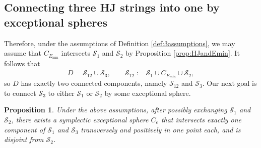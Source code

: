 \documentclass[11pt]{article}
\newtheorem{proposition}[theorem]{Proposition}
\theoremstyle{definition}
\theoremstyle{remark}
\newcommand{\st}{\mathcal{S}}
\begin{document}
\subsection{Connecting three HJ strings into one by exceptional spheres}\label{section:connecting}
Therefore, under the assumptions of Definition \ref{def:3assumptions}, we may assume that $C_{E_{\text{min}}}$ intersects $\st_1$ and $\st_2$ by Proposition \ref{prop:HJandEmin}. It follows that
\[
  \overline{D} = \st_{12} \cup \st_3,
  \qquad
  \st_{12} := \st_1  \cup C_{E_{\text{min}}}\cup \st_2,
\]
so $\overline{D}$ has exactly two connected components, namely $\st_{12}$ and $\st_3$. 
Our next goal is to connect $\st_3$ to either $\st_1$ or $\st_2$ by some exceptional sphere.

\begin{proposition}\label{prop:secondexceptional}
 Under the above assumptions, after possibly exchanging $\st_1$ and $\st_2$, there exists a symplectic exceptional sphere $C_e$ that intersects exactly one component of $\st_1$ and $\st_3$ transversely and positively in one point each, and is disjoint from $\st_2$.
\end{proposition}
\end{document}
